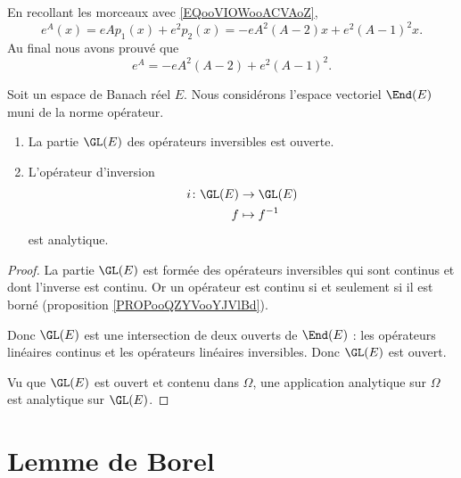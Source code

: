 En recollant les morceaux avec \eqref{EQooVIOWooACVAoZ},
\begin{equation}
	e^{A}(x)=eAp_1(x)+e^2p_2(x)=-eA^2(A-2)x+e^2(A-1)^2x.
\end{equation}
Au final nous avons prouvé que
\begin{equation}
	e^{A}=-eA^2(A-2)+e^2(A-1)^2.
\end{equation}



\begin{proposition}	\label{PROPooFXPZooKUEarD}
	Soit un espace de Banach réel \( E\). Nous considérons l'espace vectoriel \( \End(E)\) muni de la norme opérateur.
	\begin{enumerate}
		\item
		      La partie \( \GL(E)\) des opérateurs inversibles est ouverte.
		\item
		      L'opérateur d'inversion
		      \begin{equation}
			      \begin{aligned}
				      i\colon \GL(E) & \to \GL(E)     \\
				      f              & \mapsto f^{-1}
			      \end{aligned}
		      \end{equation}
		      est analytique.
	\end{enumerate}
\end{proposition}

\begin{proof}
	La partie \( \GL(E)\) est formée des opérateurs inversibles qui sont continus et dont l'inverse est continu. Or un opérateur est continu si et seulement si il est borné (proposition \ref{PROPooQZYVooYJVlBd}).

	Donc \( \GL(E)\) est une intersection de deux ouverts de \( \End(E)\) : les opérateurs linéaires continus et les opérateurs linéaires inversibles. Donc \( \GL(E)\) est ouvert.

	Vu que \( \GL(E)\) est ouvert et contenu dans \( \Omega\), une application analytique sur \( \Omega\) est analytique sur \( \GL(E)\).
\end{proof}


\section{Lemme de Borel}

